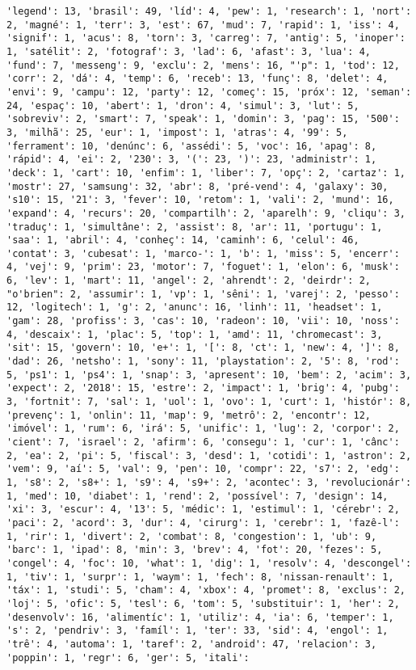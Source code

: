 \documentclass[11pt]{article}
\begin{document}
\begin{Verbatim}[commandchars=\\\{\}]
'legend': 13, 'brasil': 49, 'líd': 4, 'pew': 1, 'research': 1, 'nort': 2, 'magné': 1, 'terr': 3, 'est': 67, 'mud': 7, 'rapid': 1, 'iss': 4, 'signif': 1, 'acus': 8, 'torn': 3, 'carreg': 7, 'antig': 5, 'inoper': 1, 'satélit': 2, 'fotograf': 3, 'lad': 6, 'afast': 3, 'lua': 4, 'fund': 7, 'messeng': 9, 'exclu': 2, 'mens': 16, "'p": 1, 'tod': 12, 'corr': 2, 'dá': 4, 'temp': 6, 'receb': 13, 'funç': 8, 'delet': 4, 'envi': 9, 'campu': 12, 'party': 12, 'começ': 15, 'próx': 12, 'seman': 24, 'espaç': 10, 'abert': 1, 'dron': 4, 'simul': 3, 'lut': 5, 'sobreviv': 2, 'smart': 7, 'speak': 1, 'domin': 3, 'pag': 15, '500': 3, 'milhã': 25, 'eur': 1, 'impost': 1, 'atras': 4, '99': 5, 'ferrament': 10, 'denúnc': 6, 'assédi': 5, 'voc': 16, 'apag': 8, 'rápid': 4, 'ei': 2, '230': 3, '(': 23, ')': 23, 'administr': 1, 'deck': 1, 'cart': 10, 'enfim': 1, 'liber': 7, 'opç': 2, 'cartaz': 1, 'mostr': 27, 'samsung': 32, 'abr': 8, 'pré-vend': 4, 'galaxy': 30, 's10': 15, '21': 3, 'fever': 10, 'retom': 1, 'vali': 2, 'mund': 16, 'expand': 4, 'recurs': 20, 'compartilh': 2, 'aparelh': 9, 'cliqu': 3, 'traduç': 1, 'simultâne': 2, 'assist': 8, 'ar': 11, 'portugu': 1, 'saa': 1, 'abril': 4, 'conheç': 14, 'caminh': 6, 'celul': 46, 'contat': 3, 'cubesat': 1, 'marco-': 1, 'b': 1, 'miss': 5, 'encerr': 4, 'vej': 9, 'prim': 23, 'motor': 7, 'foguet': 1, 'elon': 6, 'musk': 6, 'lev': 1, 'mart': 11, 'angel': 2, 'ahrendt': 2, 'deirdr': 2, "o'brien": 2, 'assumir': 1, 'vp': 1, 'sêni': 1, 'varej': 2, 'pesso': 12, 'logitech': 1, 'g': 2, 'anunc': 16, 'linh': 11, 'headset': 1, 'gam': 28, 'profiss': 3, 'cas': 10, 'radeon': 10, 'vii': 10, 'noss': 4, 'descaix': 1, 'plac': 5, 'top': 1, 'amd': 11, 'chromecast': 3, 'sit': 15, 'govern': 10, 'e+': 1, '[': 8, 'ct': 1, 'new': 4, ']': 8, 'dad': 26, 'netsho': 1, 'sony': 11, 'playstation': 2, '5': 8, 'rod': 5, 'ps1': 1, 'ps4': 1, 'snap': 3, 'apresent': 10, 'bem': 2, 'acim': 3, 'expect': 2, '2018': 15, 'estre': 2, 'impact': 1, 'brig': 4, 'pubg': 3, 'fortnit': 7, 'sal': 1, 'uol': 1, 'ovo': 1, 'curt': 1, 'histór': 8, 'prevenç': 1, 'onlin': 11, 'map': 9, 'metrô': 2, 'encontr': 12, 'imóvel': 1, 'rum': 6, 'irá': 5, 'unific': 1, 'lug': 2, 'corpor': 2, 'cient': 7, 'israel': 2, 'afirm': 6, 'consegu': 1, 'cur': 1, 'cânc': 2, 'ea': 2, 'pi': 5, 'fiscal': 3, 'desd': 1, 'cotidi': 1, 'astron': 2, 'vem': 9, 'aí': 5, 'val': 9, 'pen': 10, 'compr': 22, 's7': 2, 'edg': 1, 's8': 2, 's8+': 1, 's9': 4, 's9+': 2, 'acontec': 3, 'revolucionár': 1, 'med': 10, 'diabet': 1, 'rend': 2, 'possível': 7, 'design': 14, 'xi': 3, 'escur': 4, '13': 5, 'médic': 1, 'estimul': 1, 'cérebr': 2, 'paci': 2, 'acord': 3, 'dur': 4, 'cirurg': 1, 'cerebr': 1, 'fazê-l': 1, 'rir': 1, 'divert': 2, 'combat': 8, 'congestion': 1, 'ub': 9, 'barc': 1, 'ipad': 8, 'min': 3, 'brev': 4, 'fot': 20, 'fezes': 5, 'congel': 4, 'foc': 10, 'what': 1, 'dig': 1, 'resolv': 4, 'descongel': 1, 'tiv': 1, 'surpr': 1, 'waym': 1, 'fech': 8, 'nissan-renault': 1, 'táx': 1, 'studi': 5, 'cham': 4, 'xbox': 4, 'promet': 8, 'exclus': 2, 'loj': 5, 'ofic': 5, 'tesl': 6, 'tom': 5, 'substituir': 1, 'her': 2, 'desenvolv': 16, 'alimentíc': 1, 'utiliz': 4, 'ia': 6, 'temper': 1, 's': 2, 'pendriv': 3, 'famíl': 1, 'ter': 33, 'sid': 4, 'engol': 1, 'trê': 4, 'automa': 1, 'taref': 2, 'android': 47, 'relacion': 3, 'poppin': 1, 'regr': 6, 'ger': 5, 'itali': 
\end{Verbatim}
\end{document}
